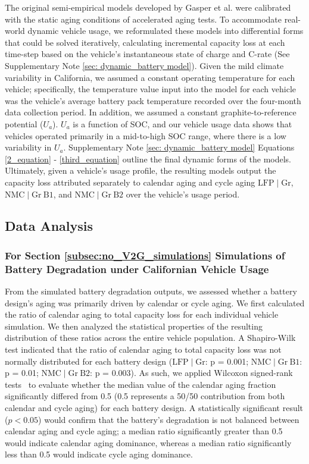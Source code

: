 \documentclass[pdflatex,sn-nature]{sn-jnl}%
\theoremstyle{thmstyleone}%
\theoremstyle{thmstyletwo}%
\theoremstyle{thmstylethree}%
\begin{document}
The original semi-empirical models developed by Gasper et al. were calibrated with the static aging conditions of accelerated aging tests. To accommodate real-world dynamic vehicle usage, we reformulated these models into differential forms that could be solved iteratively, calculating incremental capacity loss at each time-step based on the vehicle’s instantaneous state of charge and C-rate (See Supplementary Note \ref{sec: dynamic_battery model}). Given the mild climate variability in California, we assumed a constant operating temperature for each vehicle; specifically, the temperature value input into the model for each vehicle was the vehicle's average battery pack temperature recorded over the four-month data collection period. In addition, we assumed a constant graphite-to-reference potential ($U_a$). $U_a$ is a function of SOC, and our vehicle usage data shows that vehicles operated primarily in a mid-to-high SOC range, where there is a low variability in $U_a$. Supplementary Note \ref{sec: dynamic_battery model} Equations \ref{2_equation} - \ref{third_equation} outline the final dynamic forms of the models. Ultimately, given a vehicle's usage profile, the resulting models output the capacity loss attributed separately to calendar aging and cycle aging $\mathrm{LFP}\mid\mathrm{Gr}$, $\mathrm{NMC}\mid\mathrm{Gr~B1}$, and $\mathrm{NMC}\mid\mathrm{Gr~B2}$ over the vehicle’s usage period.



\subsection{Data Analysis}
\subsubsection{For Section \ref{subsec:no_V2G_simulations} Simulations of Battery Degradation under Californian Vehicle Usage}
From the simulated battery degradation outputs, we assessed whether a battery design's aging was primarily driven by calendar or cycle aging. We first calculated the ratio of calendar aging to total capacity loss for each individual vehicle simulation. We then analyzed the statistical properties of the resulting distribution of these ratios across the entire vehicle population. A Shapiro-Wilk test \cite{Shapiro_wilk} indicated that the ratio of calendar aging to total capacity loss was not normally distributed for each battery design ($\mathrm{LFP}\mid\mathrm{Gr}$: p = 0.001; $\mathrm{NMC}\mid\mathrm{Gr~B1}$: p = 0.01; $\mathrm{NMC}\mid\mathrm{Gr~B2}$: p = 0.003). As such, we applied Wilcoxon signed-rank tests~\cite{WILCOXON} to evaluate whether the median value of the calendar aging fraction significantly differed from 0.5 (0.5 represents a 50/50 contribution from both calendar and cycle aging) for each battery design. A statistically significant result ($p<0.05$) would confirm that the battery's degradation is not balanced between calendar aging and cycle aging; a median ratio significantly greater than 0.5 would indicate calendar aging dominance, whereas a median ratio significantly less than 0.5 would indicate cycle aging dominance.
\end{document}
